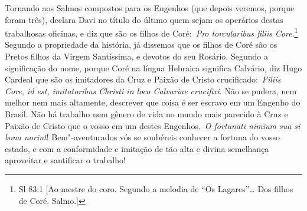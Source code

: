 Tornando aos Salmos compostos para os Engenhos (que depois
veremos, porque foram três), declara Davi no título do último quem
sejam os operários destas trabalhosas oficinas, e diz que são os filhos
de Coré:~\emph{Pro torcularibus filiis Core}.\footnote{Sl 83:1 [Ao mestre do coro. Segundo a melodia de ``Os Lagares''\ldots{} Dos filhos de Coré. Salmo.]} Segundo a propriedade da
história, já dissemos que os filhos de Coré são os Pretos filhos da
Virgem Santíssima, e devotos do seu Rosário. Segundo a significação do
nome, porque Coré na língua Hebraica significa Calvário, diz Hugo
Cardeal que são os imitadores da Cruz e Paixão de Cristo
crucificado:~\emph{Filiis Core, id est, imitatoribus Christi in loco
Calvariae crucifixi}. Não se pudera, nem melhor nem mais altamente,
descrever que coisa é ser escravo em um Engenho do Brasil. Não há
trabalho nem gênero de vida no mundo mais parecido à Cruz e Paixão de
Cristo que o vosso em um destes Engenhos.~\emph{O fortunati nimium sua
si bona norint}! Bem"-aventurados vós se soubéreis conhecer a fortuna do
vosso estado, e com a conformidade e imitação de tão alta e divina
semelhança aproveitar e santificar o trabalho!

